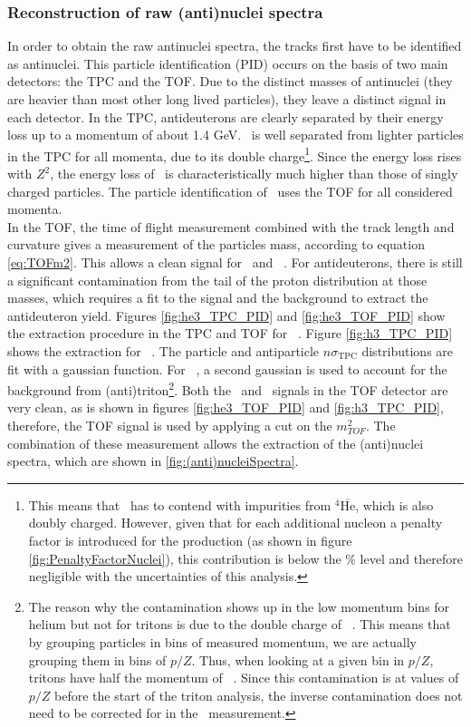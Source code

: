 \subsubsection{Reconstruction of raw (anti)nuclei spectra}\label{sec:Meth:PIDandSelections}
In order to obtain the raw antinuclei spectra, the tracks first have to be identified as antinuclei. This particle identification (PID) occurs on the basis of two main detectors: the TPC and the TOF. Due to the distinct masses of antinuclei (they are heavier than most other long lived particles), they leave a distinct signal in each detector. In the TPC, antideuterons are clearly separated by their energy loss up to a momentum of about 1.4 GeV. \ahe\ is well separated from lighter particles in the TPC for all momenta, due to its double charge\footnote{This means that \ahe\ has to contend with impurities from $^4\overline{\mathrm{He}}$, which is also doubly charged. However, given that for each additional nucleon a penalty factor is introduced for the production (as shown in figure \ref{fig:PenaltyFactorNuclei}), this contribution is below the \% level and therefore negligible with the uncertainties of this analysis.}. Since the energy loss rises with $Z^2$, the energy loss of \ahe\ is characteristically much higher than those of singly charged particles. The particle identification of \atrit\ uses the TOF for all considered momenta.\\
In the TOF, the time of flight measurement combined with the track length and curvature gives a measurement of the particles mass, according to equation \ref{eq:TOFm2}. This allows a clean signal for \atrit\ and \ahe\ . For antideuterons, there is still a significant contamination from the tail of the proton distribution at those masses, which requires a fit to the signal and the background to extract the antideuteron yield. Figures \ref{fig:he3_TPC_PID} and \ref{fig:he3_TOF_PID} show the extraction procedure in the TPC and TOF for \ahe\ . Figure \ref{fig:h3_TPC_PID} shows the extraction for \atrit\ . The particle and antiparticle $n\sigma_{\mathrm{TPC}}$ distributions are fit with a gaussian function. For \ahe\ , a second gaussian is used to account for the background from (anti)triton\footnote{The reason why the contamination shows up in the low momentum bins for helium but not for tritons is due to the double charge of \ahe\ . This means that by grouping particles in bins of measured momentum, we are actually grouping them in bins of $p/Z$. Thus, when looking at a given bin in $p/Z$, tritons have half the momentum of \ahe\ . Since this contamination is at values of $p/Z$ before the start of the triton analysis, the inverse contamination does not need to be corrected for in the \atrit\ measurement. }. Both the \ahe\ and \atrit\  signals in the TOF detector are very clean, as is shown in figures \ref{fig:he3_TOF_PID} and \ref{fig:h3_TPC_PID}, therefore, the TOF signal is used by applying a cut on the $m_{TOF}^2$.  The combination of these measurement allows the extraction of the (anti)nuclei spectra, which are shown in \ref{fig:(anti)nucleiSpectra}. 
